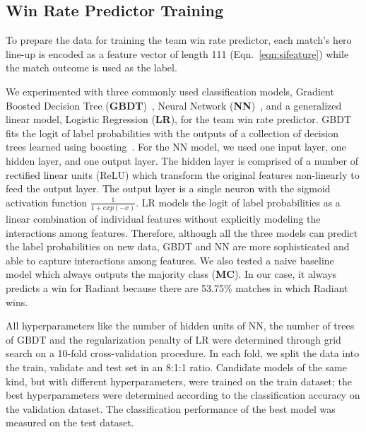 \subsection{Win Rate Predictor Training}


To prepare the data for training the team win rate predictor, each match's hero line-up is encoded as a feature vector of length 111 (Eqn.~\ref{eqn:sifeature}) while the match outcome is used as the label. 

We experimented with three commonly used classification models, Gradient Boosted Decision Tree (\textbf{GBDT})~\citep{friedman2001greedy}, Neural Network (\textbf{NN})~\citep{bishop2006pattern}, and a generalized linear model, Logistic Regression (\textbf{LR}), for the team win rate predictor. GBDT fits the logit of label probabilities with the outputs of a collection of decision trees learned using boosting~\citep{friedman2000additive}. For the NN model, we used one input layer, one hidden layer, and one output layer. The hidden layer is comprised of a number of rectified linear units (ReLU) which transform the original features non-linearly to feed the output layer. The output layer is a single neuron with the sigmoid activation function $\frac{1}{1+exp(-x)}$. 
LR models the logit of label probabilities as a linear combination of individual features without explicitly modeling the interactions among features. Therefore, although all the three models can predict the label probabilities on new data, GBDT and NN are more sophisticated and able to capture interactions among features. We also tested a naive baseline model which always outputs the majority class (\textbf{MC}). In our case, it always predicts a win for Radiant because there are 53.75\%  matches in which Radiant wins. 


All hyperparameters like the number of hidden units of NN, the number of trees of GBDT and the regularization penalty of LR were determined through grid search on a 10-fold cross-validation procedure. In each fold, we split the data into the train, validate and test set in an 8:1:1 ratio. Candidate models of the same kind, but with different hyperparameters, were trained on the train dataset; the best hyperparameters were determined according to the classification accuracy on the validation dataset. The classification performance of the best model was measured on the test dataset.  

